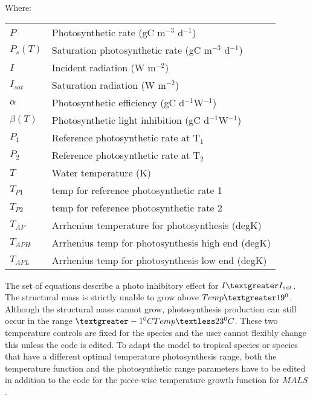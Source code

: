 \documentclass{deltares_manual}
\begin{document}
Where:\\
\begin{tabular}{ll}
$P$ & Photosynthetic rate (gC m$^{-3}$ d$^{-1}$)\\
$P_s(T)$ & Saturation photosynthetic rate (gC m$^{-3}$ d$^{-1}$)\\
$I$ & Incident radiation (W m$^{-2}$)\\
$I_{sat}$ & Saturation radiation (W m$^{-2}$)\\
$\alpha$ & Photosynthetic efficiency (gC d$^{-1}$W$^{-1}$) \\
$\beta(T)$ & Photosynthetic light inhibition (gC d$^{-1}$W$^{-1}$) \\
$P_1$ & Reference photosynthetic rate at T$_1$\\
$P_2$ & Reference photosynthetic rate at T$_2$\\
$T$ & Water temperature (K)\\
$T_{P1}$ & temp for reference photosynthetic rate 1\\
$T_{P2}$ & temp for reference photosynthetic rate 2	\\
$T_{AP}$ & Arrhenius temperature for photosynthesis               (degK)\\
$T_{APH}$ & Arrhenius temp for photosynthesis high end             (degK)\\
$T_{APL}$ & Arrhenius temp for photosynthesis low end             (degK)\\
\end{tabular}

The set of equations describe a photo inhibitory effect for $I\textgreater I_{sat}$. The structural mass is strictly unable to grow above $Temp \textgreater 19^{0}$. Although the structural mass cannot grow, photosynthesis production can still occur in the range $\textgreater -1^{0}C Temp \textless 23^{0}C$. These two temperature controls are fixed for the species and the user cannot flexibly change this unless the code is edited. To adapt the model to tropical species or species that have a different optimal temperature photosynthesis range, both the temperature function and the photosynthetic range parameters have to be edited in addition to the code for the piece-wise temperature growth function for $MALS$.
\end{document}
